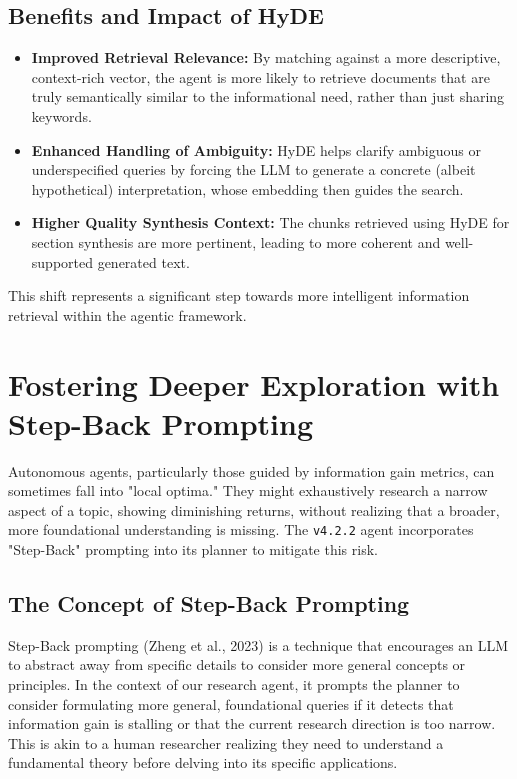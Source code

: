 \documentclass[12pt, a4paper]{article}
\begin{document}
\subsection{Benefits and Impact of HyDE}
\begin{itemize}
    \item \textbf{Improved Retrieval Relevance:} By matching against a more descriptive, context-rich vector, the agent is more likely to retrieve documents that are truly semantically similar to the informational need, rather than just sharing keywords.
    \item \textbf{Enhanced Handling of Ambiguity:} HyDE helps clarify ambiguous or underspecified queries by forcing the LLM to generate a concrete (albeit hypothetical) interpretation, whose embedding then guides the search.
    \item \textbf{Higher Quality Synthesis Context:} The chunks retrieved using HyDE for section synthesis are more pertinent, leading to more coherent and well-supported generated text.
\end{itemize}
This shift represents a significant step towards more intelligent information retrieval within the agentic framework.

\section{Fostering Deeper Exploration with Step-Back Prompting}

Autonomous agents, particularly those guided by information gain metrics, can sometimes fall into "local optima." They might exhaustively research a narrow aspect of a topic, showing diminishing returns, without realizing that a broader, more foundational understanding is missing. The \verb|v4.2.2| agent incorporates "Step-Back" prompting into its planner to mitigate this risk.

\subsection{The Concept of Step-Back Prompting}
Step-Back prompting (Zheng et al., 2023) is a technique that encourages an LLM to abstract away from specific details to consider more general concepts or principles. In the context of our research agent, it prompts the planner to consider formulating more general, foundational queries if it detects that information gain is stalling or that the current research direction is too narrow. This is akin to a human researcher realizing they need to understand a fundamental theory before delving into its specific applications.
\end{document}
